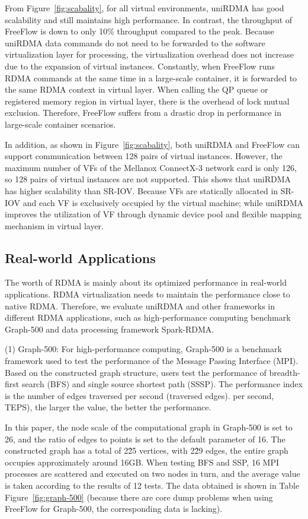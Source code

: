 From Figure~\ref{fig:scabality}, for all virtual environments, uniRDMA has good scalability and still maintains high performance. In contrast, the throughput of FreeFlow is down to only 10\% throughput compared to the peak. Because uniRDMA data commands do not need to be forwarded to the software virtualization layer for processing, the virtualization overhead does not increase due to the expansion of virtual instances. Constantly, when FreeFlow runs RDMA commands at the same time in a large-scale container, it is forwarded to the same RDMA context in virtual layer. When calling the QP queue or registered memory region in virtual layer, there is the overhead of lock mutual exclusion. Therefore, FreeFlow suffers from a drastic drop in performance in large-scale container scenarios.

In addition, as shown in Figure~\ref{fig:scabality}, both uniRDMA and FreeFlow can support communication between 128 pairs of virtual instances. However, the maximum number of VFs of the Mellanox ConnectX-3 network card is only 126, so 128 pairs of virtual instances are not supported. This shows that uniRDMA has higher scalability than SR-IOV. Because VFs are statically allocated in SR-IOV and each VF is exclusively occupied by the virtual machine; while uniRDMA improves the utilization of VF through dynamic device pool and flexible mapping mechanism in virtual layer.

\subsection{Real-world Applications}

The worth of RDMA is mainly about its optimized performance in real-world applications. RDMA virtualization needs to maintain the performance close to native RDMA. Therefore, we evaluate uniRDMA and other frameworks in different RDMA applications, such as high-performance computing benchmark Graph-500 and data processing framework Spark-RDMA.

(1) Graph-500: For high-performance computing, Graph-500 is a benchmark framework used to test the performance of the Message Passing Interface (MPI). Based on the constructed graph structure, users test the performance of breadth-first search (BFS) and single source shortest path (SSSP). The performance index is the number of edges traversed per second (traversed edges). per second, TEPS), the larger the value, the better the performance.

In this paper, the node scale of the computational graph in Graph-500 is set to 26, and the ratio of edges to points is set to the default parameter of 16. The constructed graph has a total of 2\^25 vertices, with 2\^29 edges, the entire graph occupies approximately around 16GB. When testing BFS and SSP, 16 MPI processes are scattered and executed on two nodes in turn, and the average value is taken according to the results of 12 tests. The data obtained is shown in Table Figure~\ref{fig:graph-500} (because there are core dump problems when using FreeFlow for Graph-500, the corresponding data is lacking).

